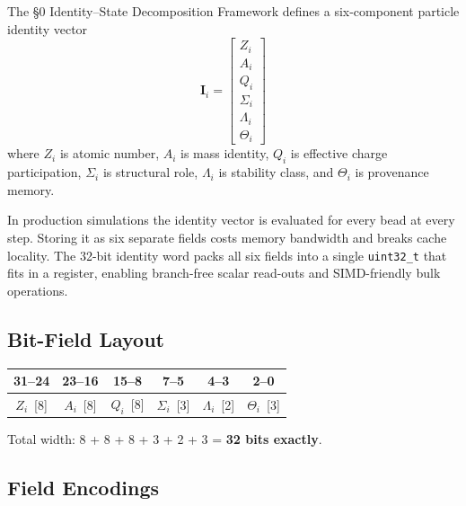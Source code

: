 \documentclass[11pt, a4paper, oneside]{article}
\theoremstyle{definition}
\newcommand{\boldI}{\bm{I}}
\begin{document}
The §0 Identity–State Decomposition Framework defines a six-component
particle identity vector
%
\begin{equation}
  \boldI_i =
  \begin{bmatrix}
    Z_i \\ A_i \\ Q_i \\ \Sigma_i \\ \Lambda_i \\ \Theta_i
  \end{bmatrix}
  \label{eq:identity-vector}
\end{equation}
%
where $Z_i$ is atomic number, $A_i$ is mass identity, $Q_i$ is effective
charge participation, $\Sigma_i$ is structural role, $\Lambda_i$ is
stability class, and $\Theta_i$ is provenance memory.

In production simulations the identity vector is evaluated for every
bead at every step.  Storing it as six separate fields costs memory
bandwidth and breaks cache locality.  The 32-bit identity word packs
all six fields into a single \texttt{uint32\_t} that fits in a
register, enabling branch-free scalar read-outs and SIMD-friendly
bulk operations.

\subsection{Bit-Field Layout}

\begin{tcolorbox}[
  colback=bitblue, colframe=blue!40!black,
  title={32-Bit Identity Word Layout},
  fonttitle=\bfseries\small
]
\begin{center}
\ttfamily\small
\begin{tabular}{|c|c|c|c|c|c|}
\hline
\textbf{31--24} & \textbf{23--16} & \textbf{15--8} &
\textbf{7--5} & \textbf{4--3} & \textbf{2--0} \\
\hline
$Z_i$~[8] & $A_i$~[8] & $Q_i$~[8] & $\Sigma_i$~[3] & $\Lambda_i$~[2] & $\Theta_i$~[3] \\
\hline
\end{tabular}
\end{center}
\end{tcolorbox}

\noindent Total width: 8 + 8 + 8 + 3 + 2 + 3 = \textbf{32 bits exactly}.

\subsection{Field Encodings}
\label{sec:bit32-encodings}
\end{document}
